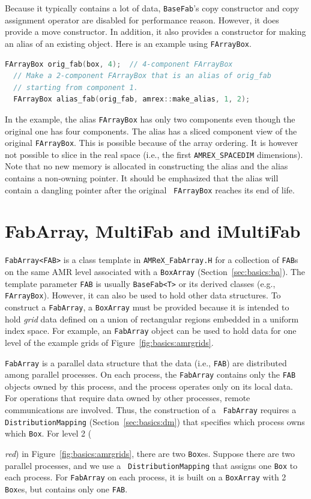{Because it typically contains a lot of data, {\tt BaseFab}'s copy
constructor and copy assignment operator are disabled for performance
reason.  However, it does provide a move constructor.  In addition, it
also provides a constructor for making an alias of an existing
object.  Here is an example using {\tt FArrayBox}.
\begin{lstlisting}[language=cpp]
  FArrayBox orig_fab(box, 4);  // 4-component FArrayBox
  // Make a 2-component FArrayBox that is an alias of orig_fab
  // starting from component 1.
  FArrayBox alias_fab(orig_fab, amrex::make_alias, 1, 2);
\end{lstlisting}
In the example, the alias {\tt FArrayBox} has only two components even
though the original one has four components.  The alias has a sliced
component view of the original {\tt FArrayBox}.  This is possible
because of the array ordering.  It is however not possible to slice in
the real space (i.e., the first {\tt AMREX\_SPACEDIM} dimensions).
Note that no new memory is allocated in constructing the alias and the
alias contains a non-owning pointer.  It should be emphasized that the
alias will contain a dangling pointer after the original {\tt
  FArrayBox} reaches its end of life.

\section{FabArray, MultiFab and iMultiFab}
\label{sec:basics:multifab}

{\tt FabArray<FAB>} is a class template in {\tt AMReX\_FabArray.H} for
a collection of {\tt FAB}s on the same AMR level associated with a
{\tt BoxArray} (Section~\ref{sec:basics:ba}).  The template parameter
{\tt FAB} is usually {\tt BaseFab<T>} or its derived classes (e.g.,
{\tt FArrayBox}).  However, it can also be used to hold other data
structures.  To construct a {\tt FabArray}, a {\tt BoxArray} must be
provided because it is intended to hold {\emph{grid}} data defined on
a union of rectangular regions embedded in a uniform index space.  For
example, an {\tt FabArray} object can be used to hold data for one
level of the example grids of Figure~\ref{fig:basics:amrgrids}.

{\tt FabArray} is a parallel data structure that the data (i.e.,
{\tt FAB}) are distributed among parallel processes.  On each process,
the {\tt FabArray} contains only the {\tt FAB} objects owned by this
process, and the process operates only on its local data.  For
operations that require data owned by other processes, remote
communications are involved.  Thus, the construction of a {\tt
  FabArray} requires a {\tt DistributionMapping}
(Section~\ref{sec:basics:dm}) that specifies which process owns which
{\tt Box}.  For level 2 ({\emph{red}) in
Figure~\ref{fig:basics:amrgrids}, there are two {\tt Box}es.  Suppose
there are two parallel processes, and we use a {\tt
  DistributionMapping} that assigns one {\tt Box} to each process.
For {\tt FabArray} on each process, it is built on a {\tt BoxArray} with
2 {\tt Box}es, but contains only one {\tt FAB}.  

}}
